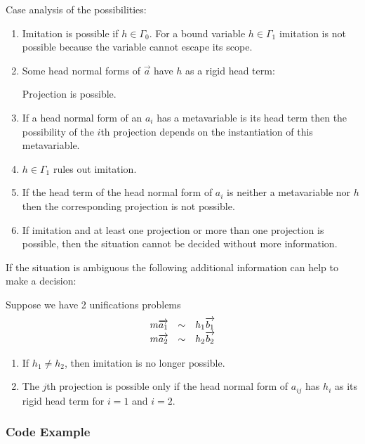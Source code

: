 Case analysis of the possibilities:
\begin{enumerate}

    \item Imitation is possible if $h \in \Gamma_0$. For a bound variable $h \in
        \Gamma_1$ imitation is not possible because the variable cannot escape
        its scope.

    \item Some head normal forms of $\vec a$ have $h$ as a rigid head term:

        Projection is possible.

    \item If a head normal form of an $a_i$ has a metavariable is its head term
        then the possibility of the $i$th projection depends on the
        instantiation of this metavariable.

    \item $h \in \Gamma_1$ rules out imitation.

    \item If the head term of the head normal form of $a_i$ is neither a
        metavariable nor $h$ then the corresponding projection is not possible.

    \item If imitation and at least one projection or more than one projection
        is possible, then the situation cannot be decided without more
        information.
\end{enumerate}


If the situation is ambiguous the following additional information can help to
make a decision:

Suppose we have 2 unifications problems
$$
\begin{array}{lllll} 
    m {\overrightarrow {a_1}} &\sim& h_1 {\overrightarrow {b_1}}
    \\
    m {\overrightarrow {a_2}} &\sim& h_2 {\overrightarrow {b_2}}
 \end{array}
$$

\begin{enumerate}

    \item If $h_1 \ne h_2$, then imitation is no longer possible.

    \item The $j$th projection is possible only if the head normal form of
        $a_{ij}$ has $h_i$ as its rigid head term for $i=1$ and $i=2$.
\end{enumerate}







\subsubsection{Code Example}

